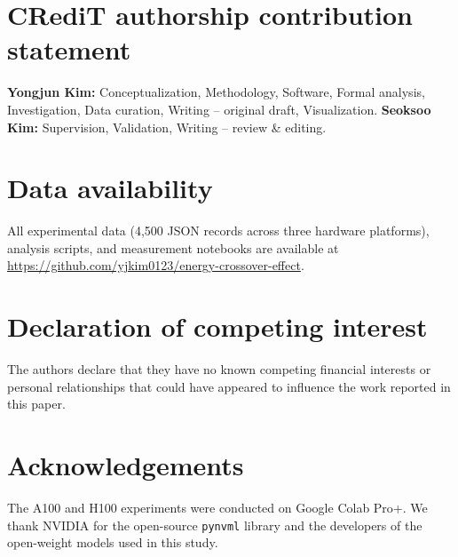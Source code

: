 \documentclass[preprint,12pt]{elsarticle}
\begin{document}

\section*{CRediT authorship contribution statement}

\textbf{Yongjun Kim:} Conceptualization, Methodology, Software, Formal analysis, Investigation, Data curation, Writing -- original draft, Visualization. \textbf{Seoksoo Kim:} Supervision, Validation, Writing -- review \& editing.


\section*{Data availability}

All experimental data (4,500 JSON records across three hardware platforms), analysis scripts, and measurement notebooks are available at \url{https://github.com/yjkim0123/energy-crossover-effect}.


\section*{Declaration of competing interest}

The authors declare that they have no known competing financial interests or personal relationships that could have appeared to influence the work reported in this paper.


\section*{Acknowledgements}

The A100 and H100 experiments were conducted on Google Colab Pro+. We thank NVIDIA for the open-source \texttt{pynvml} library and the developers of the open-weight models used in this study.




\end{document}
